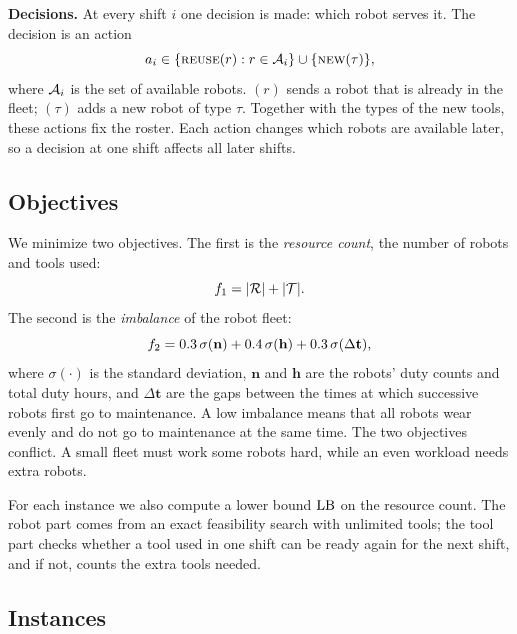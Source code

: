 \documentclass[journal]{IEEEtran}
\begin{document}
\textbf{Decisions.}
At every shift $i$ one decision is made: which robot serves it.
The decision is an action
\begin{equation}
  a_i \in \{\textsc{reuse}(r) : r \in \mathcal{A}_i\} \cup \{\textsc{new}(\tau)\},
\end{equation}
where $\mathcal{A}_i$ is the set of available robots.
\reuse{}$(r)$ sends a robot that is already in the fleet; \new{}$(\tau)$ adds a new robot of type $\tau$.
Together with the types of the new tools, these actions fix the roster.
Each action changes which robots are available later, so a decision at one shift affects all later shifts.

\subsection{Objectives}
\label{sec:problem:objectives}

We minimize two objectives.
The first is the \emph{resource count}, the number of robots and tools used:
\begin{equation}
  f_{1} = |\mathcal{R}| + |\mathcal{T}|.
\end{equation}
The second is the \emph{imbalance} of the robot fleet:
\begin{equation}
  f_{2} = 0.3\,\sigma(\mathbf{n}) + 0.4\,\sigma(\mathbf{h}) + 0.3\,\sigma(\Delta\mathbf{t}),
\end{equation}
where $\sigma(\cdot)$ is the standard deviation, $\mathbf{n}$ and $\mathbf{h}$ are the robots' duty counts and total duty hours,
and $\Delta\mathbf{t}$ are the gaps between the times at which successive robots first go to maintenance.
A low imbalance means that all robots wear evenly and do not go to maintenance at the same time.
The two objectives conflict.
A small fleet must work some robots hard, while an even workload needs extra robots.

For each instance we also compute a lower bound $\mathrm{LB}$ on the resource count.
The robot part comes from an exact feasibility search with unlimited tools;
the tool part checks whether a tool used in one shift can be ready again for the next shift, and if not, counts the extra tools needed.

\subsection{Instances}
\label{sec:problem:instances}
\end{document}
